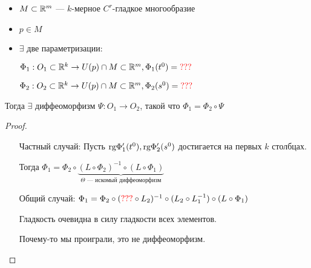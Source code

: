 \begin{corollary}\itemfix
    \begin{itemize}
        \item $M\subset\mathbb{R}^m$ --- $k$-мерное $C^r$-гладкое многообразие
        \item $p\in M$
        \item $\exists$ две параметризации:

              $\Phi_1 : O_1\subset\mathbb{R}^k \to U(p)\cap M\subset\mathbb{R}^m, \Phi_1(t^0) = \textcolor{red}{???}$

              $\Phi_2 : O_2\subset\mathbb{R}^k \to U(p)\cap M\subset\mathbb{R}^m, \Phi_2(s^0) = \textcolor{red}{???}$
    \end{itemize}

    Тогда $\exists$ диффеоморфизм $\Psi : O_1\to O_2$, такой что $\Phi_1 = \Phi_2 \circ \Psi$
\end{corollary}
\begin{proof}\itemfix
    \begin{itemize}[align=left]
        \item [Частный случай:] Пусть $\text{rg} \Phi'_1(t^0), \text{rg} \Phi'_2(s^0)$ достигается на первых $k$ столбцах.

              Тогда $\Phi_1 = \Phi_2 \circ \underbrace{(L \circ \Phi_2)^{-1} \circ (L \circ \Phi_1)}_{\Theta \text{ --- искомый диффеоморфизм}}$
        \item [Общий случай:] $\Phi_1 = \Phi_2 \circ (\textcolor{red}{???} \circ L_2)^{-1} \circ (L_2 \circ L_1^{-1}) \circ (L\circ \Phi_1)$

              Гладкость очевидна в силу гладкости всех элементов.

              Почему-то мы проиграли, это не диффеоморфизм.
    \end{itemize}
\end{proof}

